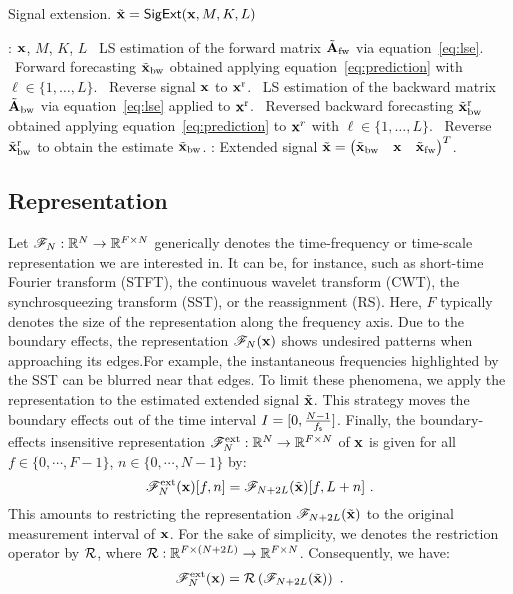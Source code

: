 \begin{algorithm}
\caption{Signal extension. $\tilde{{\mathbf x}} = \mathsf{SigExt}({\mathbf x},M,K,L)$}
\label{alg:extension}
\begin{algorithmic}
: ${\mathbf x}$, $M$, $K$, $L$
\STATE 
{}
\STATE \quad\textbullet\ LS estimation of the forward matrix $\tilde{{\mathbf A}}_{\rm fw}$ via equation~\eqref{eq:lse}.
\STATE \quad\textbullet\ Forward forecasting $\tilde{{\mathbf x}}_{\rm bw}$ obtained applying equation~\eqref{eq:prediction} with $\ell\in\{1,\ldots,L\}$.
\STATE 
{}
\STATE \quad\textbullet\ Reverse signal ${\mathbf x}$ to ${\mathbf x}^{\rm r}$. 
\STATE \quad\textbullet\ LS estimation of the backward matrix $\tilde{{\mathbf A}}_{\rm bw}$ via equation~\eqref{eq:lse} applied to ${\mathbf x}^{\rm r}$.
\STATE \quad\textbullet\ Reversed backward forecasting $\tilde{{\mathbf x}}_{\rm bw}^{\rm r}$ obtained applying equation~\eqref{eq:prediction} to ${\mathbf x}^r$ with $\ell\in\{1,\ldots,L\}$.
\STATE \quad\textbullet\ Reverse $\tilde{{\mathbf x}}_{\rm bw}^{\rm r}$ to obtain the estimate $\tilde{{\mathbf x}}_{\rm bw}$.
\STATE 
{}: Extended signal $\tilde{{\mathbf x}} = \begin{pmatrix} \tilde{{\mathbf x}}_{\rm bw}  & {\mathbf x} & \tilde{{\mathbf x}}_{\rm fw}\end{pmatrix}^T$.
\end{algorithmic}
\end{algorithm}

\subsection{Representation}
 
Let ${\mathscr F}_{N}:{\mathbb R}^{N}\to{\mathbb R}^{F\times N}$ generically denotes the time-frequency or time-scale representation we are interested in. It can be, for instance, such as short-time Fourier transform (STFT), the continuous wavelet transform (CWT), the synchrosqueezing transform (SST), or the reassignment (RS). Here, $F$ typically denotes the size of the representation along the frequency axis. Due to the boundary effects, the representation ${\mathscr F}_{N}({\mathbf x})$ shows undesired patterns when approaching its edges.For example, the instantaneous frequencies highlighted by the SST can be blurred near that edges. To limit these phenomena, we apply the representation to the estimated extended signal $\tilde{{\mathbf x}}$. This strategy moves the boundary effects out of the time interval $I=[0, \frac{N-1}{f_{\mathsf s}}]$. Finally, the boundary-effects insensitive representation ${\mathscr F}_N^{\mathrm{ext}}:{\mathbb R}^{N}\to{\mathbb R}^{F\times N}$ of ${\mathbf x}$ is given for all $f\in\{0,\cdots,F-1\}$, $n\in\{0,\cdots,N-1\}$ by:
\begin{equation}
\ccF_N^{\mathrm{ext}}(\bx)[f,n] = \ccF_{N+2L}(\tilde \bx)[f,L+n]\ .
\label{eq:restriction}
\end{equation}
This amounts to restricting the representation ${\mathscr F}_{N+2L}(\tilde {{\mathbf x}})$ to the original measurement interval of ${\mathbf x}$. For the sake of simplicity, we denotes the restriction operator by ${\mathcal R}$, where ${\mathcal R}:{\mathbb R}^{F\times (N+2L)}\to{\mathbb R}^{F\times N}$. Consequently, we have:
\begin{equation*}
{\mathscr F}_N^{\mathrm{ext}}({\mathbf x}) = {\mathcal R}\left( {\mathscr F}_{N+2L}(\tilde {{\mathbf x}}) \right) \ .
\end{equation*}

